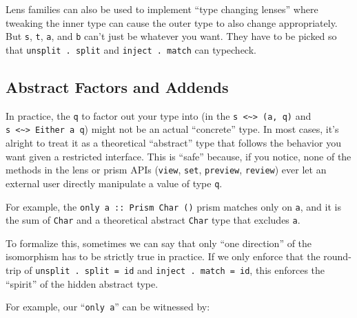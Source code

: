 \documentclass[]{article}
\begin{document}
Lens families can also be used to implement ``type changing lenses'' where
tweaking the inner type can cause the outer type to also change appropriately.
But \texttt{s}, \texttt{t}, \texttt{a}, and \texttt{b} can't just be whatever
you want. They have to be picked so that \texttt{unsplit\ .\ split} and
\texttt{inject\ .\ match} can typecheck.

\hypertarget{abstract-factors-and-addends}{%
\subsection{Abstract Factors and Addends}\label{abstract-factors-and-addends}}

In practice, the \texttt{q} to factor out your type into (in the
\texttt{s\ \textless{}\textasciitilde{}\textgreater{}\ (a,\ q)} and
\texttt{s\ \textless{}\textasciitilde{}\textgreater{}\ Either\ a\ q}) might not
be an actual ``concrete'' type. In most cases, it's alright to treat it as a
theoretical ``abstract'' type that follows the behavior you want given a
restricted interface. This is ``safe'' because, if you notice, none of the
methods in the lens or prism APIs (\texttt{view}, \texttt{set},
\texttt{preview}, \texttt{review}) ever let an external user directly manipulate
a value of type \texttt{q}.

For example, the
\texttt{only\ \textquotesingle{}a\textquotesingle{}\ ::\ Prism\textquotesingle{}\ Char\ ()}
prism matches only on \texttt{\textquotesingle{}a\textquotesingle{}}, and it is
the sum of \texttt{Char} and a theoretical abstract \texttt{Char} type that
excludes \texttt{\textquotesingle{}a\textquotesingle{}}.

To formalize this, sometimes we can say that only ``one direction'' of the
isomorphism has to be strictly true in practice. If we only enforce that the
round-trip of \texttt{unsplit\ .\ split\ =\ id} and
\texttt{inject\ .\ match\ =\ id}, this enforces the ``spirit'' of the hidden
abstract type.

For example, our ``\texttt{only\ \textquotesingle{}a\textquotesingle{}}'' can be
witnessed by:
\end{document}
